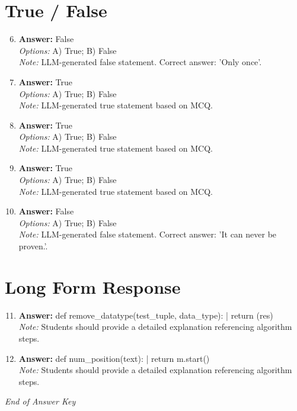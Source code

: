 \documentclass[12pt]{article}
\begin{document}
\section*{True / False}
\begin{enumerate}[label=\arabic*.]
\setcounter{enumi}{5}
\item \textbf{Answer:} False
\\ \textit{Options:} A) True; B) False
\\ \textit{Note:} LLM-generated false statement. Correct answer: 'Only once'.
\item \textbf{Answer:} True
\\ \textit{Options:} A) True; B) False
\\ \textit{Note:} LLM-generated true statement based on MCQ.
\item \textbf{Answer:} True
\\ \textit{Options:} A) True; B) False
\\ \textit{Note:} LLM-generated true statement based on MCQ.
\item \textbf{Answer:} True
\\ \textit{Options:} A) True; B) False
\\ \textit{Note:} LLM-generated true statement based on MCQ.
\item \textbf{Answer:} False
\\ \textit{Options:} A) True; B) False
\\ \textit{Note:} LLM-generated false statement. Correct answer: 'It can never be proven.'.
\end{enumerate}

\section*{Long Form Response}
\begin{enumerate}[label=\arabic*.]
\setcounter{enumi}{10}
\item \textbf{Answer:} def remove\_datatype(test\_tuple, data\_type): | return (res)
\\ \textit{Note:} Students should provide a detailed explanation referencing algorithm steps.
\item \textbf{Answer:} def num\_position(text): | return m.start()
\\ \textit{Note:} Students should provide a detailed explanation referencing algorithm steps.
\end{enumerate}

\vfill
\noindent\textit{End of Answer Key}
\end{document}
